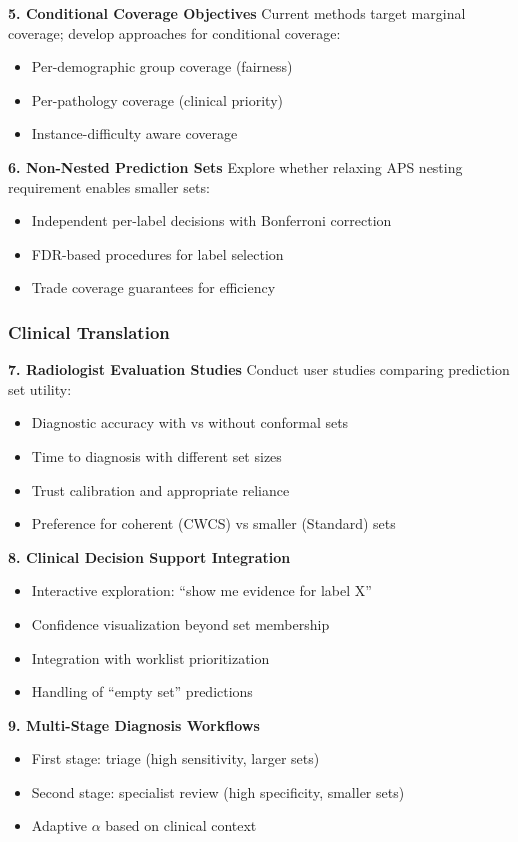\textbf{5. Conditional Coverage Objectives}
Current methods target marginal coverage; develop approaches for conditional coverage:
\begin{itemize}
    \item Per-demographic group coverage (fairness)
    \item Per-pathology coverage (clinical priority)
    \item Instance-difficulty aware coverage
\end{itemize}

\textbf{6. Non-Nested Prediction Sets}
Explore whether relaxing APS nesting requirement enables smaller sets:
\begin{itemize}
    \item Independent per-label decisions with Bonferroni correction
    \item FDR-based procedures for label selection
    \item Trade coverage guarantees for efficiency
\end{itemize}

\subsubsection{Clinical Translation}

\textbf{7. Radiologist Evaluation Studies}
Conduct user studies comparing prediction set utility:
\begin{itemize}
    \item Diagnostic accuracy with vs without conformal sets
    \item Time to diagnosis with different set sizes
    \item Trust calibration and appropriate reliance
    \item Preference for coherent (CWCS) vs smaller (Standard) sets
\end{itemize}

\textbf{8. Clinical Decision Support Integration}
\begin{itemize}
    \item Interactive exploration: ``show me evidence for label X''
    \item Confidence visualization beyond set membership
    \item Integration with worklist prioritization
    \item Handling of ``empty set'' predictions
\end{itemize}

\textbf{9. Multi-Stage Diagnosis Workflows}
\begin{itemize}
    \item First stage: triage (high sensitivity, larger sets)
    \item Second stage: specialist review (high specificity, smaller sets)
    \item Adaptive $\alpha$ based on clinical context
\end{itemize}


